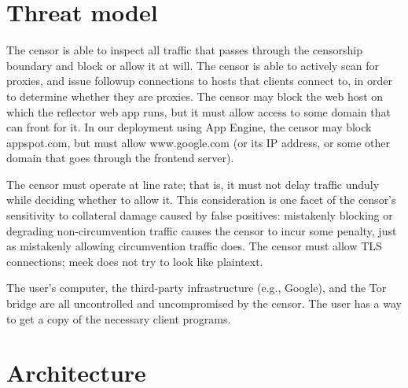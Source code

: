 \documentclass[conference]{IEEEtran}
\begin{document}

\section{Threat model}

The censor is able to inspect all traffic that passes through
the censorship boundary and block or allow it at will.
The censor is able to actively scan for proxies, and issue followup
connections to hosts that clients connect to, in order to determine
whether they are proxies.
The censor may block the web host on which the reflector web app runs,
but it must allow access to some domain that can front for it.
In our deployment using App Engine, the censor may block appspot.com,
but must allow www.google.com (or its IP address, or some other domain
that goes through the frontend server).

The censor must operate at line rate; that is,
it must not delay traffic unduly while deciding whether to allow it.
This consideration is one facet of the censor's sensitivity to
collateral damage caused by false positives:
mistakenly blocking or degrading non-circumvention traffic causes the censor
to incur some penalty, just as mistakenly allowing circumvention traffic does.
The censor must allow TLS connections; meek does not try to look like plaintext.

The user's computer, the third-party infrastructure (e.g., Google), and the Tor bridge
are all uncontrolled and uncompromised by the censor.
The user has a way to get a copy of the necessary client programs.

\section{Architecture}
\end{document}
